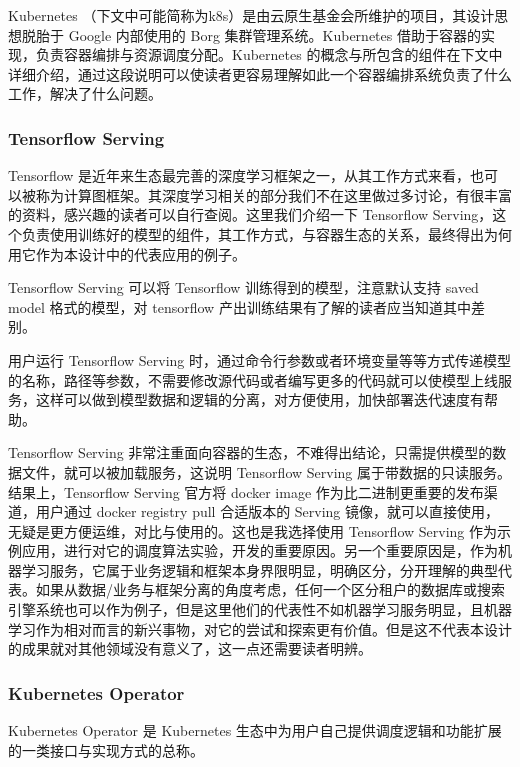 Kubernetes （下文中可能简称为k8s）是由云原生基金会所维护的项目，其设计思想脱胎于 Google 内部使用的 Borg 集群管理系统。Kubernetes 借助于容器的实现，负责容器编排与资源调度分配。Kubernetes 的概念与所包含的组件在下文中详细介绍，通过这段说明可以使读者更容易理解如此一个容器编排系统负责了什么工作，解决了什么问题。

\subsubsection{Tensorflow Serving}

Tensorflow 是近年来生态最完善的深度学习框架之一，从其工作方式来看，也可以被称为计算图框架。其深度学习相关的部分我们不在这里做过多讨论，有很丰富的资料，感兴趣的读者可以自行查阅。这里我们介绍一下 Tensorflow Serving，这个负责使用训练好的模型的组件，其工作方式，与容器生态的关系，最终得出为何用它作为本设计中的代表应用的例子。

Tensorflow Serving 可以将 Tensorflow 训练得到的模型，注意默认支持 saved model 格式的模型，对 tensorflow 产出训练结果有了解的读者应当知道其中差别。

用户运行 Tensorflow Serving 时，通过命令行参数或者环境变量等等方式传递模型的名称，路径等参数，不需要修改源代码或者编写更多的代码就可以使模型上线服务，这样可以做到模型数据和逻辑的分离，对方便使用，加快部署迭代速度有帮助。

Tensorflow Serving 非常注重面向容器的生态，不难得出结论，只需提供模型的数据文件，就可以被加载服务，这说明 Tensorflow Serving 属于带数据的只读服务。结果上，Tensorflow Serving 官方将 docker image 作为比二进制更重要的发布渠道，用户通过 docker registry pull 合适版本的 Serving 镜像，就可以直接使用，无疑是更方便运维，对比与使用的。这也是我选择使用 Tensorflow Serving 作为示例应用，进行对它的调度算法实验，开发的重要原因。另一个重要原因是，作为机器学习服务，它属于业务逻辑和框架本身界限明显，明确区分，分开理解的典型代表。如果从数据/业务与框架分离的角度考虑，任何一个区分租户的数据库或搜索引擎系统也可以作为例子，但是这里他们的代表性不如机器学习服务明显，且机器学习作为相对而言的新兴事物，对它的尝试和探索更有价值。但是这不代表本设计的成果就对其他领域没有意义了，这一点还需要读者明辨。

\subsubsection{Kubernetes Operator}

Kubernetes Operator 是 Kubernetes 生态中为用户自己提供调度逻辑和功能扩展的一类接口与实现方式的总称。


